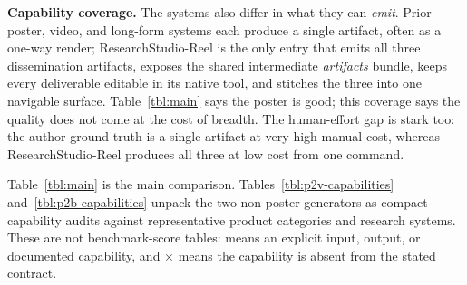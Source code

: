 \documentclass{article}
\providecommand{\cmark}{\textcolor{teal}{\checkmark}}
\providecommand{\xmark}{\textcolor{red!65!black}{\ensuremath{\times}}}
\begin{document}
\begingroup
\renewcommand{\thefootnote}{}
\endgroup

\textbf{Capability coverage.} The systems also differ in what they can \emph{emit}. Prior poster, video, and long-form systems each produce a single artifact, often as a one-way render; ResearchStudio-Reel is the only entry that emits all three dissemination artifacts, exposes the shared intermediate \emph{artifacts} bundle, keeps every deliverable editable in its native tool, and stitches the three into one navigable surface. Table~\ref{tbl:main} says the poster is good; this coverage says the quality does not come at the cost of breadth. The human-effort gap is stark too: the author ground-truth is a single artifact at very high manual cost, whereas ResearchStudio-Reel produces all three at low cost from one command.

Table~\ref{tbl:main} is the main comparison. Tables~\ref{tbl:p2v-capabilities} and~\ref{tbl:p2b-capabilities} unpack the two non-poster generators as compact capability audits against representative product categories and research systems. These are not benchmark-score tables: \cmark{} means an explicit input, output, or documented capability, and \xmark{} means the capability is absent from the stated contract.


\end{document}
